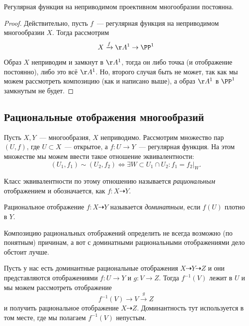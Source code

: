	\begin{corollary}
		Регулярная функция на неприводимом проективном многообразии постоянна. 
	\end{corollary}

	\begin{proof}
		Действительно, пусть $f$~--- регулярная функция на неприводимом многообразии $X$. Тогда рассмотрим 
		\[
			X \xrightarrow{f} \AA^1 \to \PP^1
		\]
		

		Образ $X$ неприводим и замкнут в $\AA^1$, тогда он либо точка (и отображение постоянно), либо это всё $\AA^1$. Но, второго случая быть не может, так как мы можем рассмотреть композицию (как и написано выше), а образ $\AA^1$ в $\PP^1$ замкнутым не будет. 
	\end{proof}

	\subsection{Рациональные отображения многообразий }

	\begin{definition} 
		Пусть $X, Y$~--- многообразия, $X$ неприводимо. Рассмотрим множество пар $(U, f)$, где $U \subset X$~--- открытое, а $f\colon U \to Y$~--- регулярная функция. На этом множестве мы можем ввести такое отношение эквивалентности: 
		\[
			(U_1, f_1) \sim (U_2, f_2) \Leftrightarrow \exists W \subset U_1 \cap U_2 \colon f_1 = f_2\vert_{W}.
		\]

		Класс эквивалентности по этому отношению называется \emph{рациональным} отображением и обозначается, как $f\colon X \dashrightarrow Y$.
	\end{definition}

	\begin{definition} 
		Рациональное отображение $f\colon X \dashrightarrow Y$ называется \emph{доминатным}, если $f(U)$ плотно в $Y$.
	\end{definition}

	\begin{remark}
		Композицию рациональных отображений определить не всегда возможно (по понятным) причинам, а вот с доминатными рациональными отображениями дело обстоит лучше. 
	\end{remark}

	Пусть у нас есть доминантные рациональные отображения $X \dashrightarrow Y \dashrightarrow Z$ и они представляются отображениями $f\colon U \to Y$ и $g\colon V \to Z$. Тогда $f^{-1}(V)$ лежит в $U$ и мы можем рассмотреть отображение 
	\[
	 	f^{-1}(V) \to V \xrightarrow{g} Z
	 \] 
	 и получить рациональное отображение $X \dashrightarrow Z$. Доминантность тут используется в том месте, где мы полагаем $f^{-1}(V)$ непустым. 

